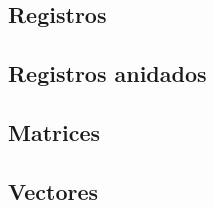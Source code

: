 \documentclass{article}
\begin{document}
\begin{appendices}
  \subsection{Registros}


  \subsection{Registros anidados}
  \subsection{Matrices}
  \subsection{Vectores}
\end{appendices}
\end{document}
